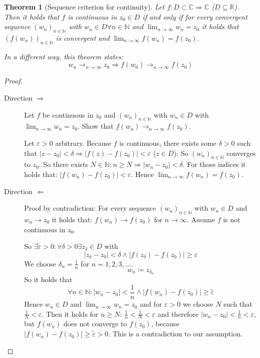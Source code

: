 \documentclass[a4paper,landscape,twocolumn]{article}
\newtheorem{theorem}{Theorem}
\newcommand\abs[1]{\left|#1\right|}
\newcommand\seq[1]{{\left(#1\right)}_{n \in \mathbb N}}
\begin{document}
\begin{theorem}[Sequence criterion for continuity]
  Let $f: D \subset \mathbb C \Rightarrow \mathbb C$ ($D \subseteq \mathbb R$).
  Then it holds that $f$ is continuous in $z_0 \in D$ if and only if
  for every convergent sequence $\seq{w_n}$ with $w_n \in D \forall n \in \mathbb N$
  and $\lim_{n\to\infty} w_n = z_0$ it holds that $\seq{f(w_n)}$ is convergent
  and $\lim_{n\to\infty} f(w_n) = f(z_0)$.

  In a different way, this theorem states:
  \[ w_n \to_{n\to\infty} z_0 \Rightarrow f(w_0) \to_{n\to\infty} f(z_0) \]
\end{theorem}
\begin{proof}
  \begin{description}
    \item[Direction $\Rightarrow$]
      Let $f$ be continuous in $z_0$ and $\seq{w_n}$ with $w_n \in D$ with $\lim_{n\to\infty} w_n = z_0$.
      Show that $f(w_n) \to_{n\to\infty} f(z_0)$.

      Let $\varepsilon > 0$ arbitrary. Because $f$ is continuous, there exists some $\delta > 0$
      such that $\abs{z - z_0} < \delta \Rightarrow \abs{f(z) - f(z_0)} < \varepsilon$ ($z \in D$).
      So $\seq{w_n}$ converges to $z_0$.
      So there exists $N \in \mathbb N: n \geq N \Rightarrow \abs{w_n - z_0} < \delta$.
      For those indices it holds that: $\abs{f(w_n) - f(z_0)} < \varepsilon$.
      Hence $\lim_{n\to\infty} f(w_n) = f(z_0)$.
    \item[Direction $\Leftarrow$]
      Proof by contradiction: For every sequence $\seq{w_n}$ with $w_n \in D$ and $w_n \to z_0$
      it holds that: $f(w_n) \to f(z_0)$ for $n \to \infty$.
      Assume $f$ is not continuous in $z_0$.

      So $\exists \tilde{\varepsilon} > 0: \forall \delta > 0 \exists z_\delta \in D$ with
      \[ \abs{z_\delta - z_0} < \delta \land \abs{f(z_\delta) - f(z_0)} \geq \varepsilon \]
      We choose $\delta_n = \frac1n$ for $n = 1,2,3,\ldots$.
      \[ w_n \coloneqq z_{\delta_n} \]
      So it holds that
      \[ \forall n \in \mathbb N: \abs{w_n - z_0} < \frac1n \land \abs{f(w_n) - f(z_0)} \geq \tilde\varepsilon \]
      Hence $w_n \in D$ and $\lim_{n\to\infty} w_n = z_0$ and for $\varepsilon > 0$ we choose $N$
      such that $\frac1N < \varepsilon$. Then it holds for $n \geq N$: $\frac1n < \frac1N < \varepsilon$
      and therefore $\abs{w_n - z_0} < \frac1n < \varepsilon$, but $f(w_n)$ does not converge to $f(z_0)$,
      because $\abs{f(w_n) - f(z_0)} \geq \tilde{\varepsilon} > 0$. This is a contradiction to our assumption.
  \end{description}
\end{proof}
\end{document}
